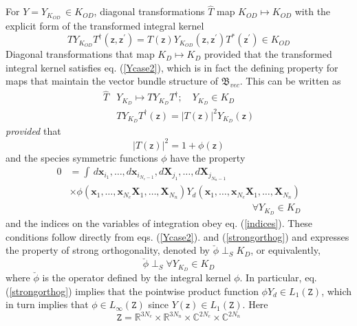 \documentclass[aps,preprint]{revtex4}%
\begin{document}
For $Y=Y_{K_{OD}}\,\in K_{OD}$, diagonal transformations $\hat{T}$ map
$K_{OD}\mapsto K_{OD}$ with the explicit form of the transformed integral
kernel
\begin{equation}
TY_{K_{OD}}T^{\dagger}(\mathsf{z},\mathsf{z}^{\prime})=T(\mathsf{z})Y_{K_{OD}%
}(\mathsf{z},\mathsf{z}^{\prime})T^{\ast}(\mathsf{z}^{\prime})\in K_{OD}
\label{TYodTkernel}%
\end{equation}
Diagonal transformations that map $K_{D}\mapsto K_{D}$ provided that the
transformed integral kernel satisfies eq. (\ref{Ycase2}), which is in fact the
defining property for maps that maintain the vector bundle structure of
$\mathfrak{B}_{vec}$. This can be written as
\begin{align}
\hat{T}  &  Y_{K_{D}}\mapsto TY_{K_{D}}T^{\dagger};\quad Y_{K_{D}}\in
K_{D}\nonumber\\
&  TY_{K_{D}}T^{\dagger}(\mathsf{z})=|T(\mathsf{z})|^{2}Y_{K_{D}}(\mathsf{z})
\end{align}
\emph{provided} that
\begin{equation}
|T(\mathsf{z})|^{2}=1+\phi(\mathsf{z}) \label{phidef}%
\end{equation}
and the species symmetric functions $\phi$ have the property
\begin{align}
0  &  =\int\,d\mathbf{x}_{i_{1}},\ldots,d\mathbf{x}_{i_{N_{e}-1}}%
,d\mathbf{X}_{j_{1}},\ldots,d\mathbf{X}_{j_{N_{n}-1}}\nonumber\\
&  \times\phi(\mathbf{x}_{1},\ldots,\mathbf{x}_{N_{e}}\mathbf{X}_{1}%
,\ldots,\mathbf{X}_{N_{n}})Y_{d}(\mathbf{x}_{1},\ldots,\mathbf{x}_{N_{e}%
}\mathbf{X}_{1},\ldots,\mathbf{X}_{N_{n}})\nonumber\\
&  \qquad\qquad\qquad\qquad\qquad\qquad\qquad\qquad\qquad\quad\forall
Y_{K_{D}}\in K_{D} \label{strongorthog}%
\end{align}
and the indices on the variables of integration obey eq. (\ref{indices}).
These conditions follow directly from eqs. (\ref{Ycase2}). and
(\ref{strongorthog}) and expresses the property of strong orthogonality,
denoted by $\breve{\phi}\perp_{S}K_{D}$, or equivalently,
\begin{equation}
\breve{\phi}\perp_{S}\forall Y_{K_{D}}\in K_{D}%
\end{equation}
where $\breve{\phi}$ is the operator defined by the integral kernel $\phi$. In
particular, eq. (\ref{strongorthog}) implies that the pointwise product
function $\phi Y_{d}\in L_{1}(\mathtt{Z})$, which in turn implies that
$\phi\in L_{\infty}(\mathtt{Z})$ since $Y(\mathsf{z})\in L_{1}(\mathtt{Z})$.
Here
\begin{equation}
\mathtt{Z}=\mathbb{R}^{3N_{e}}\times\mathbb{R}^{3N_{n}}\times\mathbb{C}%
^{2N_{e}}\times\mathbb{C}^{2N_{n}}%
\end{equation}
\end{document}

